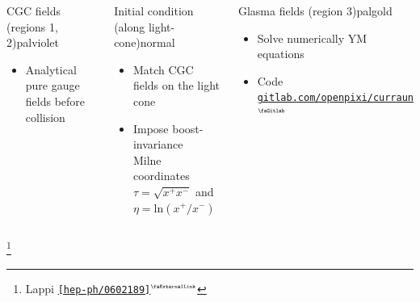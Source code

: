 \documentclass[aspectratio=169,11pt,usenames,dvipsnames]{beamer}
\renewcommand{\thefootnote}{\color{customblue}\faPaperPlaneO}
\newcommand\blfootnote[1]{%
  \begingroup
  \renewcommand\thefootnote{}\footnote{#1}%
  \addtocounter{footnote}{-1}%
  \endgroup
}
\begin{document}
\begin{frame}
\begin{columns}[onlytextwidth,t]
        \begin{custombox2}{{\normalsize CGC fields} {\tiny (regions 1, 2)}}{palviolet}
            \small
            \begin{varwidth}{0.92\textwidth}
            \begin{itemize}\itemsep0em 
                \footnotesize
                \item Analytical {\color{red}pure gauge} fields before collision
            \end{itemize}
            \end{varwidth}
        \end{custombox2}

        \begin{custombox2}{{\normalsize Initial condition} {\tiny (along light-cone)}}{normal}
            \small
            \begin{varwidth}{0.92\textwidth}
            \begin{itemize}\itemsep0em 
                \footnotesize
                \item Match CGC fields on the light cone
                \item Impose boost-invariance\\
                {\tiny\color{lightgray} Milne coordinates {\color{Blue}$\tau=\sqrt{x^+x^-}$} and {\color{ForestGreen}$\eta=\mathrm{ln}(x^+/x^-)$}}
            \end{itemize}
            \end{varwidth}
        \end{custombox2}

        \begin{custombox2}{{\normalsize Glasma fields} {\tiny (region 3)}}{palgold}
            \small
            \begin{varwidth}{0.92\textwidth}
            \begin{itemize}\itemsep0em 
                \footnotesize
                \item Solve numerically YM equations
                \item Code \href{https://gitlab.com/openpixi/curraun}{\color{palgold}\texttt{gitlab.com/openpixi/curraun}$^\text{\tiny\faGitlab}$}
            \end{itemize}
            \end{varwidth}
        \end{custombox2}
    \end{columns}
    \blfootnote{\scriptsize Lappi \href{https://arxiv.org/abs/hep-ph/0602189}{{\color{palgold}\texttt{[hep-ph/0602189]}$^\text{\tiny\faExternalLink}$}}}
\end{frame}
\end{document}
